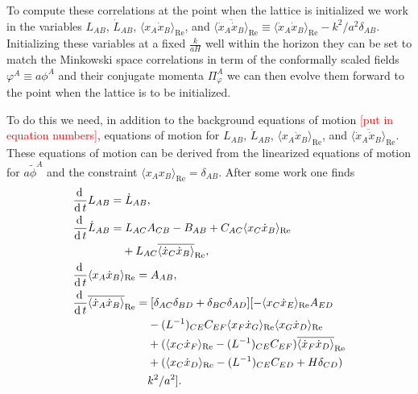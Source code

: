
To compute these correlations at the point when the lattice is initialized we work in the variables $L_{AB}$, $\dot{L}_{AB}$, $\langle x_A\dot{x}_B \rangle_\mathrm{Re}$, and $\overline{\langle \dot{x}_A\dot{x}_B \rangle}_\mathrm{Re} \equiv \langle \dot{x}_A\dot{x}_B \rangle_\mathrm{Re} - k^2/a^2\delta_{AB}$. Initializing these variables at a fixed $\frac{k}{aH}$ well within the horizon they can be set to match the Minkowski space correlations in term of the conformally scaled fields $\varphi^A \equiv a\phi^A$ and their conjugate momenta $\Pi_\varphi^A$ we can then evolve them forward to the point when the lattice is to be initialized. 

To do this we need, in addition to the background equations of motion \textcolor{red}{[put in equation numbers]}, equations of motion for $L_{AB}$, $\dot{L}_{AB}$, $\langle x_A\dot{x}_B \rangle_\mathrm{Re}$, and $\overline{\langle \dot{x}_A\dot{x}_B \rangle}_\mathrm{Re}$. These equations of motion can be derived from the linearized equations of motion for $a\tilde{\phi}^A$ and the constraint $\langle x_Ax_B \rangle_\mathrm{Re} = \delta_{AB}$. After some work one finds
\begin{align}
  & \frac{\dd}{\dd t} L_{AB} = \dot{L}_{AB}, \\
  & \frac{\dd}{\dd t} \dot{L}_{AB} = L_{AC}A_{CB} - B_{AB} + C_{AC}\langle x_C\dot{x}_B \rangle_\mathrm{Re} \nonumber \\
  & \hphantom{\frac{\dd}{\dd t} \dot{L}_{AB} = } + L_{AC}\overline{\langle \dot{x}_C\dot{x}_B \rangle}_\mathrm{Re}, \\
  & \frac{\dd}{\dd t} \langle x_A\dot{x}_B \rangle_\mathrm{Re} = A_{AB}, \\
  & \frac{\dd}{\dd t} \overline{\langle \dot{x}_A\dot{x}_B \rangle}_\mathrm{Re} = [\delta_{AC}\delta_{BD} + \delta_{BC}\delta_{AD}][-\langle x_C\dot{x}_E \rangle_\mathrm{Re} A_{ED} \nonumber  \\
    & \hphantom{\frac{\dd}{\dd t} \overline{\langle \dot{x}_A\dot{x}_B \rangle}_\mathrm{Re} =} - (L^{-1})_{CE}C_{EF}\langle x_F\dot{x}_G \rangle_\mathrm{Re}\langle x_G\dot{x}_D \rangle_\mathrm{Re} \nonumber \\
    & \hphantom{\frac{\dd}{\dd t} \overline{\langle \dot{x}_A\dot{x}_B \rangle}_\mathrm{Re} =} + (\langle x_C\dot{x}_F \rangle_\mathrm{Re} - (L^{-1})_{CE}C_{EF})\overline{\langle \dot{x}_F\dot{x}_D \rangle}_\mathrm{Re} \nonumber \\
    & \hphantom{\frac{\dd}{\dd t} \overline{\langle \dot{x}_A\dot{x}_B \rangle}_\mathrm{Re} =} + (\langle x_C\dot{x}_D \rangle_\mathrm{Re} - (L^{-1})_{CE}C_{ED} + H\delta_{CD}) \nonumber \\
    & \hphantom{\frac{\dd}{\dd t} \overline{\langle \dot{x}_A\dot{x}_B \rangle}_\mathrm{Re} =} k^2/a^2].
\end{align}
